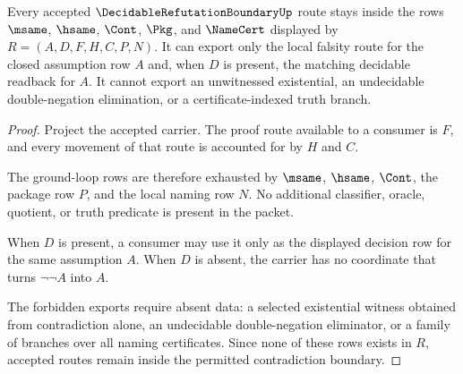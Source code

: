\begin{theorem}
\label{thm:decidable-refutation-ground-loop-exhaustion}
Every accepted $\DecidableRefutationBoundaryUp$ route stays inside the rows $\msame$, $\hsame$, $\Cont$, $\Pkg$, and $\NameCert$ displayed by $R=(A,D,F,H,C,P,N)$. It can export only the local falsity route for the closed assumption row $A$ and, when $D$ is present, the matching decidable readback for $A$. It cannot export an unwitnessed existential, an undecidable double-negation elimination, or a certificate-indexed truth branch.
\end{theorem}
\begin{proof}
Project the accepted carrier. The proof route available to a consumer is $F$, and every movement of that route is accounted for by $H$ and $C$.

The ground-loop rows are therefore exhausted by $\msame$, $\hsame$, $\Cont$, the package row $P$, and the local naming row $N$. No additional classifier, oracle, quotient, or truth predicate is present in the packet.

When $D$ is present, a consumer may use it only as the displayed decision row for the same assumption $A$. When $D$ is absent, the carrier has no coordinate that turns $\neg\neg A$ into $A$.

The forbidden exports require absent data: a selected existential witness obtained from contradiction alone, an undecidable double-negation eliminator, or a family of branches over all naming certificates. Since none of these rows exists in $R$, accepted routes remain inside the permitted contradiction boundary.
\end{proof}


\begin{closurestatus}{\DecidableRefutationBoundaryUp}
  \theoryclosure{\seedClosure}
  \formalstatus{\unformalizedV}
\end{closurestatus}
